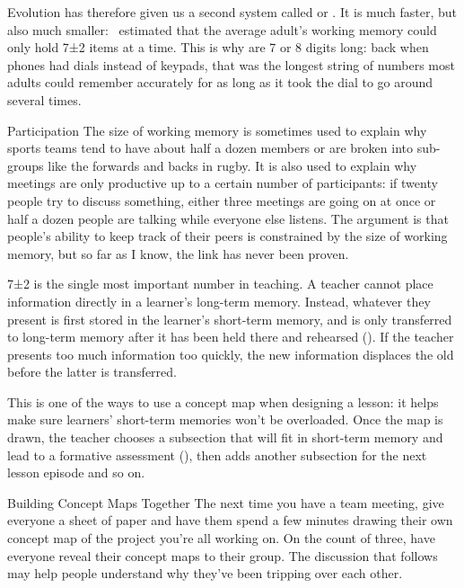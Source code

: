 Evolution has therefore given us a second system
called 
or .
It is much faster,
but also much smaller:~\cite{Mill1956} estimated that the average adult's working memory could only hold 7±2 items at a time.
This is why 
are 7 or 8 digits long:
back when phones had dials instead of keypads,
that was the longest string of numbers most adults could remember accurately for as long as it took the dial to go around several times.

\begin{aside}{Participation}
  The size of working memory is sometimes used to explain
  why sports teams tend to have about half a dozen members
  or are broken into sub-groups like the forwards and backs in rugby.
  It is also used to explain why meetings are only productive up to a certain number of participants:
  if twenty people try to discuss something,
  either three meetings are going on at once
  or half a dozen people are talking while everyone else listens.
  The argument is that people's ability to keep track of their peers is constrained by the size of working memory,
  but so far as I know,
  the link has never been proven.
\end{aside}

7±2 is the single most important number in teaching.
A teacher cannot place information directly in a learner's long-term memory.
Instead,
whatever they present is first stored in the learner's short-term memory,
and is only transferred to long-term memory after it has been held there and rehearsed ().
If the teacher presents too much information too quickly,
the new information displaces the old
before the latter is transferred.

This is one of the ways to use a concept map when designing a lesson:
it helps make sure learners' short-term memories won't be overloaded.
Once the map is drawn,
the teacher chooses a subsection that will fit in short-term memory
and lead to a formative assessment (),
then adds another subsection for the next lesson episode and so on.


\begin{aside}{Building Concept Maps Together}
  The next time you have a team meeting,
  give everyone a sheet of paper
  and have them spend a few minutes drawing their own concept map of the project you're all working on.
  On the count of three,
  have everyone reveal their concept maps to their group.
  The discussion that follows may help people understand
  why they've been tripping over each other.
\end{aside}

